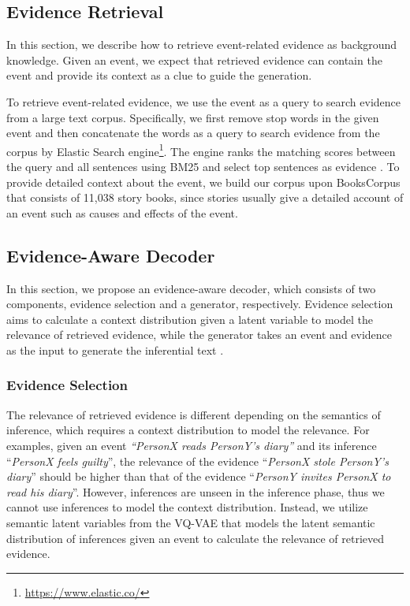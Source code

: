 \documentclass[11pt,a4paper]{article}
\begin{document}
\subsection{Evidence Retrieval}
In this section, we describe how to retrieve event-related evidence as background knowledge. Given an event, we expect that retrieved evidence can contain the event and provide its context as a clue to guide the generation. 

To retrieve event-related evidence, we use the event as a query to search evidence from a large \mbox{text} corpus. Specifically, we first remove stop words in the given event and then concatenate the \mbox{words} as a query to search evidence from the corpus by \mbox{Elastic} Search engine\footnote{\url{https://www.elastic.co/}}. The engine ranks the matching scores between the query and all sentences using BM25 and select top  sentences as evidence .
To provide detailed context about the event, we build our corpus upon BooksCorpus \cite{zhu2015aligning} that consists of 11,038 story books,
since stories usually give a detailed account of an event such as causes and effects of the event.   

\subsection{Evidence-Aware Decoder}
In this section, we propose an evidence-aware decoder, which consists of two components, evidence selection and a generator, respectively. Evidence selection aims to calculate a context distribution  given a latent variable  to model the relevance of retrieved evidence, while the generator  takes an event  and evidence  as the input to generate the inferential text .  










\subsubsection{Evidence Selection}
The relevance of retrieved evidence is different depending on the semantics of inference, which requires a context distribution to model the relevance. For examples, given an event \textit{``PersonX reads PersonY's diary''} and its inference ``\textit{PersonX feels guilty}'', the relevance of the evidence ``\textit{PersonX stole PersonY's diary}'' should be higher than that of the evidence   ``\textit{PersonY invites PersonX to read his diary}''.
However, inferences are unseen in the inference phase, thus we cannot use inferences to model the context distribution.
Instead, we \mbox{utilize} semantic latent variables from the VQ-VAE that models the latent semantic distribution of inferences given an event to calculate the relevance of retrieved evidence. 
\end{document}
